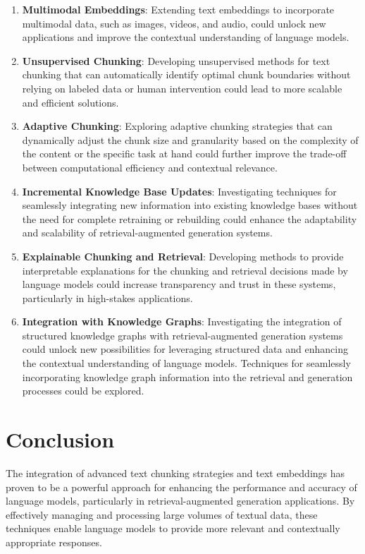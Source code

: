 \documentclass[
  letterpaper,
  DIV=11,
  numbers=noendperiod]{scrartcl}
\begin{document}
\begin{enumerate}
\def\labelenumi{\arabic{enumi}.}
\item
  \textbf{Multimodal Embeddings}: Extending text embeddings to
  incorporate multimodal data, such as images, videos, and audio, could
  unlock new applications and improve the contextual understanding of
  language models.
\item
  \textbf{Unsupervised Chunking}: Developing unsupervised methods for
  text chunking that can automatically identify optimal chunk boundaries
  without relying on labeled data or human intervention could lead to
  more scalable and efficient solutions.
\item
  \textbf{Adaptive Chunking}: Exploring adaptive chunking strategies
  that can dynamically adjust the chunk size and granularity based on
  the complexity of the content or the specific task at hand could
  further improve the trade-off between computational efficiency and
  contextual relevance.
\item
  \textbf{Incremental Knowledge Base Updates}: Investigating techniques
  for seamlessly integrating new information into existing knowledge
  bases without the need for complete retraining or rebuilding could
  enhance the adaptability and scalability of retrieval-augmented
  generation systems.
\item
  \textbf{Explainable Chunking and Retrieval}: Developing methods to
  provide interpretable explanations for the chunking and retrieval
  decisions made by language models could increase transparency and
  trust in these systems, particularly in high-stakes applications.
\item
  \textbf{Integration with Knowledge Graphs}: Investigating the
  integration of structured knowledge graphs with retrieval-augmented
  generation systems could unlock new possibilities for leveraging
  structured data and enhancing the contextual understanding of language
  models. Techniques for seamlessly incorporating knowledge graph
  information into the retrieval and generation processes could be
  explored.
\end{enumerate}

\section{Conclusion}\label{conclusion}

The integration of advanced text chunking strategies and text embeddings
has proven to be a powerful approach for enhancing the performance and
accuracy of language models, particularly in retrieval-augmented
generation applications. By effectively managing and processing large
volumes of textual data, these techniques enable language models to
provide more relevant and contextually appropriate responses.
\end{document}
